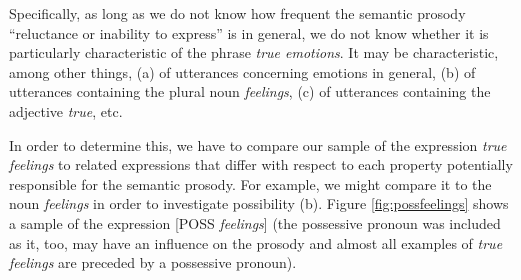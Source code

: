 Specifically, as long as we do not know how frequent the semantic prosody ``reluctance or inability to express'' is in general, we do not know whether it is particularly characteristic of the phrase \textit{true emotions}. It may be characteristic, among other things, (a) of utterances concerning emotions in general, (b) of utterances containing the plural noun \textit{feelings}, (c) of utterances containing the adjective \textit{true}, etc.

In order to determine this, we have to compare our sample of the expression \textit{true feelings} to related expressions that differ with respect to each property potentially responsible for the semantic prosody. For example, we might compare it to the noun \textit{feelings} in order to investigate possibility (b). Figure \ref{fig:possfeelings} shows a sample of the expression [POSS \textit{feelings}] (the possessive pronoun was included as it, too, may have an influence on the prosody and almost all examples of \textit{true feelings} are preceded by a possessive pronoun).

